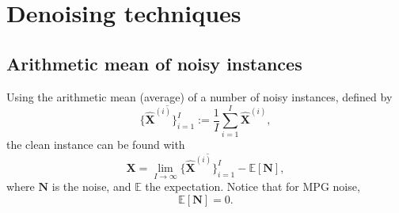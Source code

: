 \documentclass{article}
\begin{document}
\section{Denoising techniques}


\subsection{Arithmetic mean of noisy instances}
Using the arithmetic mean (average) of a number of noisy instances, defined by
\begin{equation}
  \overline{\{\hat{\mathbf X}^{(i)}\}_{i=1}^I} := \frac{1}{I} \sum_{i=1}^I \hat{\mathbf X}^{(i)},
  \label{eq:mean}
\end{equation}
the clean instance can be found with
\begin{equation}
  {\mathbf X} = \lim_{I \to \infty} \overline{\{\hat{\mathbf X}^{(i)}\}_{i=1}^I}  - \mathbb{E}\left[\mathbf{N}\right],
  \label{eq:mean_with_bias}
\end{equation}
where $\mathbf{N}$ is the noise, and $\mathbb{E}$ the expectation. Notice that for MPG noise,
\begin{equation}
  \mathbb{E}\left[\mathbf{N}\right] = 0.
\end{equation}
\end{document}
